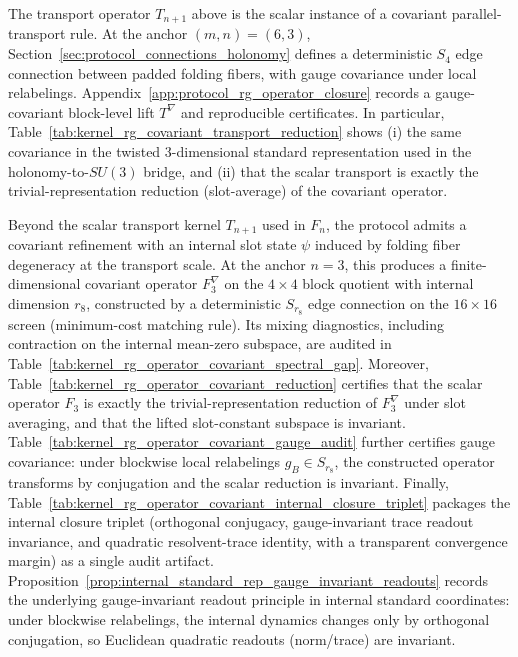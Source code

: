 \begin{remark}\label{rem:covariant_transport_refinement}
\AuditTag The transport operator $T_{n+1}$ above is the scalar instance of a covariant parallel-transport rule.
At the anchor $(m,n)=(6,3)$, Section~\ref{sec:protocol_connections_holonomy} defines a deterministic $S_4$ edge connection between padded folding fibers, with gauge covariance under local relabelings.
Appendix~\ref{app:protocol_rg_operator_closure} records a gauge-covariant block-level lift $T^\nabla$ and reproducible certificates.
In particular, Table~\ref{tab:kernel_rg_covariant_transport_reduction} shows (i) the same covariance in the twisted $3$-dimensional standard representation used in the holonomy-to-$SU(3)$ bridge, and (ii) that the scalar transport is exactly the trivial-representation reduction (slot-average) of the covariant operator.
\end{remark}

\begin{remark}\label{rem:covariant_rg_refinement_internal_state}
\AuditTag Beyond the scalar transport kernel $T_{n+1}$ used in $F_n$, the protocol admits a covariant refinement with an internal slot state $\psi$ induced by folding fiber degeneracy at the transport scale.
At the anchor $n=3$, this produces a finite-dimensional covariant operator $F_3^\nabla$ on the $4\times4$ block quotient with internal dimension $r_8$, constructed by a deterministic $S_{r_8}$ edge connection on the $16\times16$ screen (minimum-cost matching rule).
Its mixing diagnostics, including contraction on the internal mean-zero subspace, are audited in Table~\ref{tab:kernel_rg_operator_covariant_spectral_gap}.
\AuditTag Moreover, Table~\ref{tab:kernel_rg_operator_covariant_reduction} certifies that the scalar operator $F_3$ is exactly the trivial-representation reduction of $F_3^\nabla$ under slot averaging, and that the lifted slot-constant subspace is invariant.
\AuditTag Table~\ref{tab:kernel_rg_operator_covariant_gauge_audit} further certifies gauge covariance: under blockwise local relabelings $g_B\in S_{r_8}$, the constructed operator transforms by conjugation and the scalar reduction is invariant.
\AuditTag Finally, Table~\ref{tab:kernel_rg_operator_covariant_internal_closure_triplet} packages the internal closure triplet (orthogonal conjugacy, gauge-invariant trace readout invariance, and quadratic resolvent-trace identity, with a transparent convergence margin) as a single audit artifact.
\AuditTag Proposition~\ref{prop:internal_standard_rep_gauge_invariant_readouts} records the underlying gauge-invariant readout principle in internal standard coordinates: under blockwise relabelings, the internal dynamics changes only by orthogonal conjugation, so Euclidean quadratic readouts (norm/trace) are invariant.
\end{remark}

